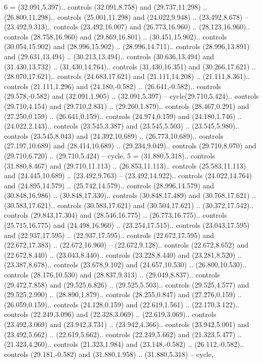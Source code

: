 {6} = {(32.091,5.397).. controls (32.091,8.758) and (29.737,11.298) .. (26.800,11.298).. controls (25.001,11.298) and (24.022,9.948) .. (23.492,8.678) -- (23.492,9.313).. controls (23.492,16.007) and (26.773,16.960) .. (28.123,16.960).. controls (28.758,16.960) and (29.869,16.801) .. (30.451,15.902).. controls (30.054,15.902) and (28.996,15.902) .. (28.996,14.711).. controls (28.996,13.891) and (29.631,13.494) .. (30.213,13.494).. controls (30.636,13.494) and (31.430,13.732) .. (31.430,14.764).. controls (31.430,16.351) and (30.266,17.621) .. (28.070,17.621).. controls (24.683,17.621) and (21.111,14.208) .. (21.111,8.361).. controls (21.111,1.296) and (24.180,-0.582) .. (26.641,-0.582).. controls (29.578,-0.582) and (32.091,1.905) .. (32.091,5.397) -- cycle(29.710,5.424).. controls (29.710,4.154) and (29.710,2.831) .. (29.260,1.879).. controls (28.467,0.291) and (27.250,0.159) .. (26.641,0.159).. controls (24.974,0.159) and (24.180,1.746) .. (24.022,2.143).. controls (23.545,3.387) and (23.545,5.503) .. (23.545,5.980).. controls (23.545,8.043) and (24.392,10.689) .. (26.773,10.689).. controls (27.197,10.689) and (28.414,10.689) .. (29.234,9.049).. controls (29.710,8.070) and (29.710,6.720) .. (29.710,5.424) -- cycle},
{5} = {(31.880,5.318).. controls (31.880,8.467) and (29.710,11.113) .. (26.853,11.113).. controls (25.583,11.113) and (24.445,10.689) .. (23.492,9.763) -- (23.492,14.922).. controls (24.022,14.764) and (24.895,14.579) .. (25.742,14.579).. controls (28.996,14.579) and (30.848,16.986) .. (30.848,17.330).. controls (30.848,17.489) and (30.768,17.621) .. (30.583,17.621).. controls (30.583,17.621) and (30.504,17.621) .. (30.372,17.542).. controls (29.843,17.304) and (28.546,16.775) .. (26.773,16.775).. controls (25.715,16.775) and (24.498,16.960) .. (23.254,17.515).. controls (23.043,17.595) and (22.937,17.595) .. (22.937,17.595).. controls (22.672,17.595) and (22.672,17.383) .. (22.672,16.960) -- (22.672,9.128).. controls (22.672,8.652) and (22.672,8.440) .. (23.043,8.440).. controls (23.228,8.440) and (23.281,8.520) .. (23.387,8.678).. controls (23.678,9.102) and (24.657,10.530) .. (26.800,10.530).. controls (28.176,10.530) and (28.837,9.313) .. (29.049,8.837).. controls (29.472,7.858) and (29.525,6.826) .. (29.525,5.503).. controls (29.525,4.577) and (29.525,2.990) .. (28.890,1.879).. controls (28.255,0.847) and (27.276,0.159) .. (26.059,0.159).. controls (24.128,0.159) and (22.619,1.561) .. (22.170,3.122).. controls (22.249,3.096) and (22.328,3.069) .. (22.619,3.069).. controls (23.492,3.069) and (23.942,3.731) .. (23.942,4.366).. controls (23.942,5.001) and (23.492,5.662) .. (22.619,5.662).. controls (22.249,5.662) and (21.323,5.477) .. (21.323,4.260).. controls (21.323,1.984) and (23.148,-0.582) .. (26.112,-0.582).. controls (29.181,-0.582) and (31.880,1.958) .. (31.880,5.318) -- cycle},
